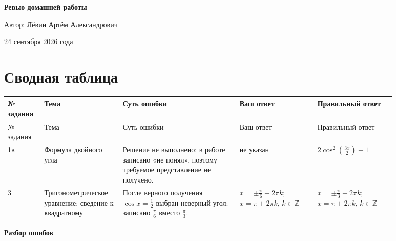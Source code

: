 \documentclass[12pt,a4paper]{article}
\begin{document}
\begin{titlepage}
\centering
\vspace*{0.22\textheight}
{\LARGE\bfseries Ревью домашней работы\par}
\vspace{2cm}
{\large Автор: Лёвин Артём Александрович\par}
\vspace{0.8cm}
{\large 24 сентября 2026 года\par}
\vfill
{}
\end{titlepage}

\newpage
\section*{Сводная таблица}
\small
\setlength{\tabcolsep}{3pt}
\begin{longtable}{>{\centering\arraybackslash}p{0.08\linewidth} p{0.17\linewidth} p{0.27\linewidth} p{0.18\linewidth} p{0.18\linewidth}}
\toprule
№ задания & Тема & Суть ошибки & Ваш ответ & Правильный ответ \\
\midrule
\endfirsthead
\toprule
№ задания & Тема & Суть ошибки & Ваш ответ & Правильный ответ \\
\midrule
\endhead
\hyperref[task:1c]{1в} & Формула двойного угла & Решение не выполнено: в работе записано «не понял», поэтому требуемое представление не получено. & не указан & $2\cos^2\!\left(\frac{3x}{2}\right)-1$ \\
\addlinespace
\hyperref[task:3]{3} & Тригоно\-метри\-ческое уравнение; сведение к квадратному & После верного получения $\cos x=\frac12$ выбран неверный угол: записано $\frac{\pi}{6}$ вместо $\frac{\pi}{3}$. & $x=\pm\frac{\pi}{6}+2\pi k$;\newline $x=\pi+2\pi k$, $k\in\mathbb Z$ & $x=\pm\frac{\pi}{3}+2\pi k$;\newline $x=\pi+2\pi k$, $k\in\mathbb Z$ \\
\bottomrule
\end{longtable}
\normalsize

\newpage
\thispagestyle{empty}
\vspace*{\fill}
\begin{center}
{\LARGE\bfseries Разбор ошибок}
\end{center}
\vspace*{\fill}
\end{document}
